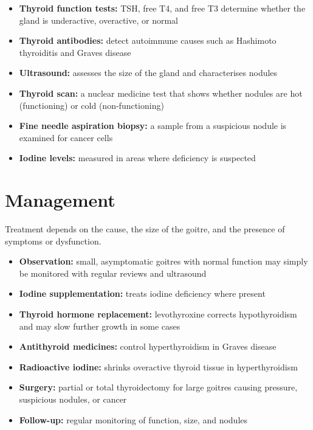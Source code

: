 \begin{itemize}
    \item \textbf{Thyroid function tests:} TSH, free T4, and free T3 determine whether the gland is underactive, overactive, or normal
    \item \textbf{Thyroid antibodies:} detect autoimmune causes such as Hashimoto thyroiditis and Graves disease
    \item \textbf{Ultrasound:} assesses the size of the gland and characterises nodules
    \item \textbf{Thyroid scan:} a nuclear medicine test that shows whether nodules are hot (functioning) or cold (non-functioning)
    \item \textbf{Fine needle aspiration biopsy:} a sample from a suspicious nodule is examined for cancer cells
    \item \textbf{Iodine levels:} measured in areas where deficiency is suspected
\end{itemize}

\section*{Management}
Treatment depends on the cause, the size of the goitre, and the presence of symptoms or dysfunction.

\begin{itemize}
    \item \textbf{Observation:} small, asymptomatic goitres with normal function may simply be monitored with regular reviews and ultrasound
    \item \textbf{Iodine supplementation:} treats iodine deficiency where present
    \item \textbf{Thyroid hormone replacement:} levothyroxine corrects hypothyroidism and may slow further growth in some cases
    \item \textbf{Antithyroid medicines:} control hyperthyroidism in Graves disease
    \item \textbf{Radioactive iodine:} shrinks overactive thyroid tissue in hyperthyroidism
    \item \textbf{Surgery:} partial or total thyroidectomy for large goitres causing pressure, suspicious nodules, or cancer
    \item \textbf{Follow-up:} regular monitoring of function, size, and nodules
\end{itemize}

